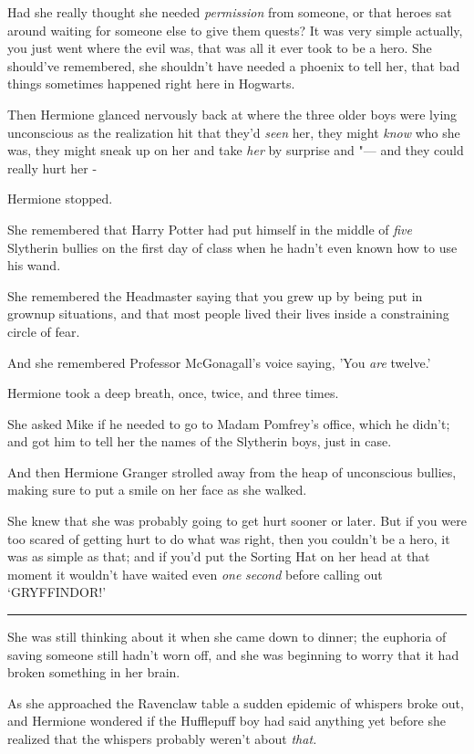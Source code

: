 Had she really thought she needed \emph{permission} from someone, or
that heroes sat around waiting for someone else to give them quests? It
was very simple actually, you just went where the evil was, that was all
it ever took to be a hero. She should've remembered, she shouldn't have
needed a phoenix to tell her, that bad things sometimes happened right
here in Hogwarts.

Then Hermione glanced nervously back at where the three older boys were
lying unconscious as the realization hit that they'd \emph{seen} her,
they might \emph{know} who she was, they might sneak up on her and take
\emph{her} by surprise and "--- and they could really hurt her -

Hermione stopped.

She remembered that Harry Potter had put himself in the middle of
\emph{five} Slytherin bullies on the first day of class when he hadn't
even known how to use his wand.

She remembered the Headmaster saying that you grew up by being put in
grownup situations, and that most people lived their lives inside a
constraining circle of fear.

And she remembered Professor McGonagall's voice saying, 'You \emph{are}
twelve.'

Hermione took a deep breath, once, twice, and three times.

She asked Mike if he needed to go to Madam Pomfrey's office, which he
didn't; and got him to tell her the names of the Slytherin boys, just in
case.

And then Hermione Granger strolled away from the heap of unconscious
bullies, making sure to put a smile on her face as she walked.

She knew that she was probably going to get hurt sooner or later. But if
you were too scared of getting hurt to do what was right, then you
couldn't be a hero, it was as simple as that; and if you'd put the
Sorting Hat on her head at that moment it wouldn't have waited even
\emph{one} \emph{second} before calling out `GRYFFINDOR!'

\begin{center}\rule{3in}{0.4pt}\end{center}

She was still thinking about it when she came down to dinner; the
euphoria of saving someone still hadn't worn off, and she was beginning
to worry that it had broken something in her brain.

As she approached the Ravenclaw table a sudden epidemic of whispers
broke out, and Hermione wondered if the Hufflepuff boy had said anything
yet before she realized that the whispers probably weren't about
\emph{that.}

